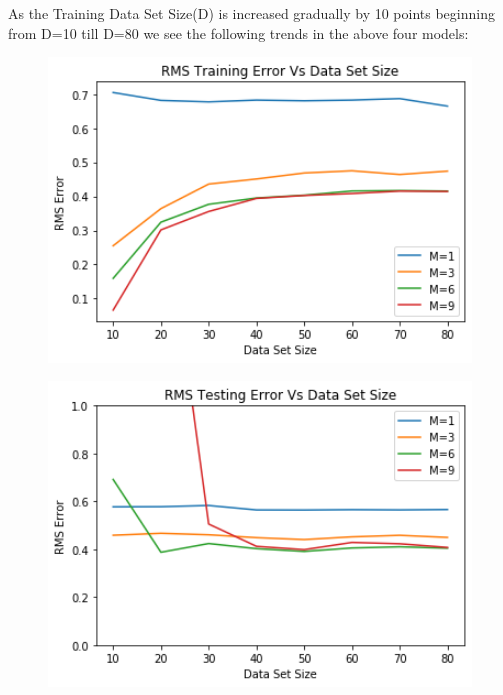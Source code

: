 \documentclass[a4 paper]{article}
\begin{document}
 As the Training Data Set Size(D) is increased gradually by 10 points beginning from D=10 till D=80 we see the following trends in the above four models:\\
\begin{figure}[!htb]
    \centering
    \begin{minipage}{0.49\textwidth}
        \centering
        \includegraphics[width=1\textwidth]{ErrorTrain.png} \\
         
    \end{minipage}\hfill
    \begin{minipage}{0.49\textwidth}
        \centering
        \includegraphics[width=1\textwidth]{ErrorTest.png}\\
    
    \end{minipage}
    \label{fig:l}
\end{figure}
\end{document}

